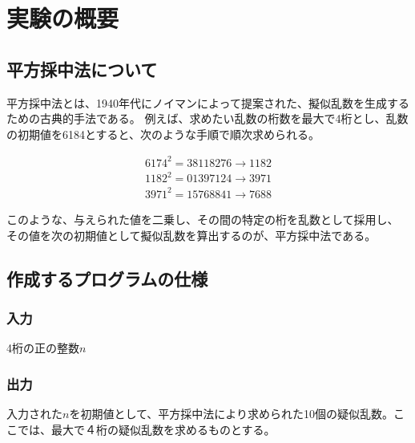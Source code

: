 

\section{実験の概要}
\subsection{平方採中法について}
  平方採中法とは、1940年代にノイマンによって提案された、擬似乱数を生成するための古典的手法である。
  例えば、求めたい乱数の桁数を最大で4桁とし、乱数の初期値を6184とすると、次のような手順で順次求められる。

  \begin{align*}
    6174^2 = 38118276 → 1182 \\
    1182^2 = 01397124 → 3971 \\
    3971^2 = 15768841 → 7688
  \end{align*}

  このような、与えられた値を二乗し、その間の特定の桁を乱数として採用し、
  その値を次の初期値として擬似乱数を算出するのが、平方採中法である。

\subsection{作成するプログラムの仕様}
  \subsubsection{入力}
    4桁の正の整数$n$

  \subsubsection{出力}
    入力された$n$を初期値として、平方採中法により求められた10個の疑似乱数。ここでは、最大で４桁の疑似乱数を求めるものとする。



